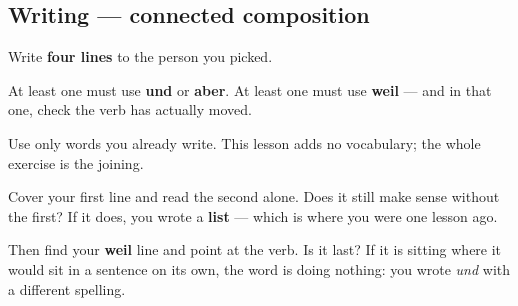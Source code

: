 \subsection*{Writing — connected composition}
Write \textbf{four lines} to the person you picked.

At least one must use \textbf{und} or \textbf{aber}. At least one must use \textbf{weil} — and in that one, check the verb has actually moved.

Use only words you already write. This lesson adds no vocabulary; the whole exercise is the joining.

\begin{tcolorbox}[breakable,colback=teal!4,colframe=teal!35!black,title={Before you move on}]
Cover your first line and read the second alone. Does it still make sense without the first? If it does, you wrote a \textbf{list} — which is where you were one lesson ago.

Then find your \textbf{weil} line and point at the verb. Is it last? If it is sitting where it would sit in a sentence on its own, the word is doing nothing: you wrote \emph{und} with a different spelling.
\end{tcolorbox}

